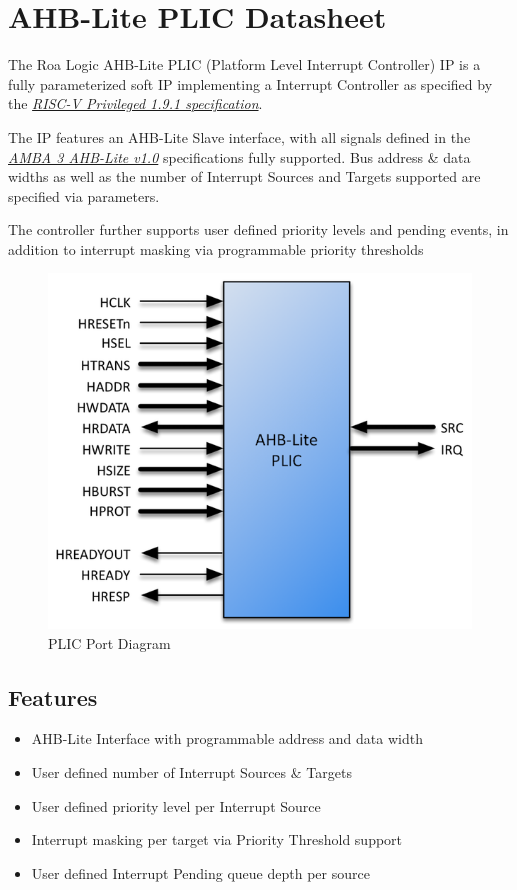 \section{AHB-Lite PLIC Datasheet}

The Roa Logic AHB-Lite PLIC (Platform Level Interrupt Controller) IP is a fully parameterized soft IP implementing a Interrupt Controller as specified by the \emph{\href{https://people.eecs.berkeley.edu/\%7Ekrste/papers/riscv-privileged-v1.9.1.pdf}{RISC-V Privileged 1.9.1 specification}}.

The IP features an AHB-Lite Slave interface, with all signals defined in the \emph{\href{https://www.arm.com/products/system-ip/amba-specifications}{AMBA 3 AHB-Lite v1.0}} specifications fully supported. Bus address \& data widths as well as the number of Interrupt Sources and Targets supported are specified via parameters.

The controller further supports user defined priority levels and pending events, in addition to interrupt masking via programmable priority thresholds

\begin{figure}[h]
  \centering
  \includegraphics{../assets/graphics/AHB-Lite_PLIC_Port_Diagram.png}
  \caption{PLIC Port Diagram}
\end{figure}

\subsection{Features}

\begin{itemize}
\item
  AHB-Lite Interface with programmable address and data width
\item
  User defined number of Interrupt Sources \& Targets
\item
  User defined priority level per Interrupt Source
\item
  Interrupt masking per target via Priority Threshold support
\item
  User defined Interrupt Pending queue depth per source
\end{itemize}